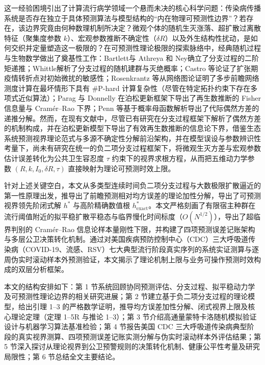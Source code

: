 \documentclass[11pt,a4paper]{article}
\theoremstyle{plain}
\theoremstyle{definition}
\begin{document}
这一经验困境引出了计算流行病学领域一个悬而未决的核心科学问题：传染病传播系统是否存在独立于具体预测算法与模型结构的“内在物理可预测性边界”？若存在，该边界究竟由何种数理机制所决定？微观个体的随机生灭涨落、超扩散过离散特征（聚集度参数 $k$）、宏观参数推断不确定性（$\delta R$）以及外生结构性扰动，是如何交织并定量塑造这一极限的？在可预测性理论极限的探索脉络中，经典随机过程与生物数学做出了奠基性工作：Bartlett\citep{bartlett1957measles}与 Athreya 和 Ney\citep{athreya1972branching}确立了分支过程的二阶矩递推；Whittle\citep{whittle1955outcome}解析了分支过程的随机建群与灭绝概率；Castro 等\citep{castro2020predictability}论证了扩张期疫情转折点对初始微扰的敏感性；Rosenkrantz 等\citep{rosenkrantz2022fundamental}从网络图论证明了多步前瞻网络测度计算在最坏情形下具有 \#P-hard 计算复杂性（尽管在特定拓扑约束下存在多项式近似算法）；Parag 与 Donnelly\citep{parag2022fundamental} 在泊松更新框架下导出了再生数推断的 Fisher 信息量与 Cram\'er--Rao 下界；Penn 等\citep{penn2023intrinsic}基于概率母函数解析导出了代际偶然方差的递推分解。然而，在现有文献中，尽管已有研究在分支过程框架下解析了偶然方差的机制构成\citep{penn2023intrinsic}，并在泊松更新模型下导出了有效再生数推断的信息论下界\citep{parag2022fundamental}，借鉴生态系统预测视界理论范式\citep{petchey2015ecological}与多源不确定性分解前沿架构\citep{dietze2017prediction, wesselkamp2025forecast, taylor2016stochasticity, park2020reconciling}，并在模型误设与参数辨识性考量下\citep{king2015avoidable}，尚未有研究在统一的负二项分支过程框架下，将微观生灭方差与宏观参数估计误差转化为公共卫生容忍度 $\tau$ 约束下的视界求根方程，从而把五维动力学参数 $(R, k, I_0, \delta R, \tau)$ 直接映射为理论可预测时效上限。

针对上述关键空白，本文从多类型连续时间负二项分支过程与大数极限扩散逼近的第一性原理出发，推导出了前瞻预测相对均方误差的理论加性分解，导出了可预测视界领先阶闭式解 $h^*$ 与高阶精确数值根 $h^*_{\text{exact}}$。本文严格刻画了有限宿主种群在流行阈值附近的拟平稳扩散平稳态与临界慢化时间标度（$O(N^{1/2})$），导出了超临界判别的 Cram\'er--Rao 信息论样本量刚性下限，并构建了四项预测误差记账架构与多层公卫决策转化机制。通过对美国疾病预防控制中心（CDC）三大呼吸道传染病（COVID-19、流感、RSV）七大典型流行阶段真实序列的系统实证测算与逐周伪实时滚动样本外预测验证，本文揭示了理论机制上限与业务可操作预测时效构成的双层分析框架。

本文的结构安排如下：第 1 节系统回顾协同预测评估、分支过程、拟平稳动力学及可预测性理论边界的相关研究进展；第 2 节建立基于负二项分支过程的理论模型，给出引理 1--3 的严格数学证明，推导均方误差加性分解、闭式视界上限及核心理论定理（定理 1--5R 与推论 1--3）；第 3 节介绍高通量蒙特卡洛随机模拟验证设计与机器学习算法基准检验；第 4 节报告美国 CDC 三大呼吸道传染病典型阶段的真实视界测算、四项预测误差记账实测分解与伪实时滚动样本外评估结果；第 5 节深入探讨从理论视界到公卫预警规则的决策转化机制、健康公平性考量及研究局限性；第 6 节总结全文主要结论。
\end{document}
